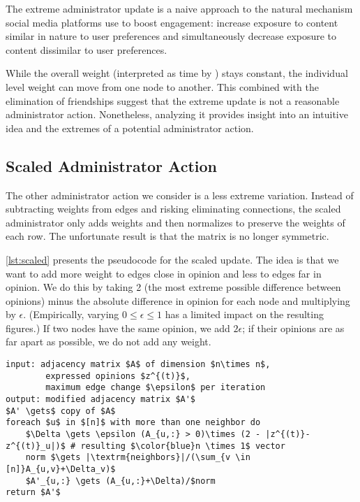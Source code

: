 The extreme administrator update is a naive approach
to the natural mechanism social media platforms use
to boost engagement: increase exposure to content
similar in nature to user preferences
and simultaneously decrease exposure to content
dissimilar to user preferences.

While the overall weight (interpreted as time
by \cite{chitra20analyzing}) stays constant,
the individual level weight can move from one
node to another.
This combined with the elimination of friendships
suggest that the extreme update is not a reasonable
administrator action.
Nonetheless, analyzing it provides insight into an
intuitive idea and the extremes of a potential
administrator action.

\pagebreak

\subsection{Scaled Administrator Action}
The other administrator action we consider
is a less extreme variation.
Instead of subtracting weights from edges
and risking eliminating connections,
the scaled administrator only adds weights
and then normalizes to preserve the 
weights of each row.
The unfortunate result is that the
matrix is no longer symmetric.

\cref{lst:scaled} presents the pseudocode for
the scaled update.
The idea is that we want to add more weight
to edges close in opinion and less to edges far
in opinion.
We do this by taking 2 (the most extreme possible
difference between opinions) minus the absolute
difference in opinion for each node
and multiplying by $\epsilon$.
(Empirically, varying $0 \leq \epsilon \leq 1$
has a limited impact on the resulting figures.)
If two nodes have the same opinion, we add
$2\epsilon$; if their opinions are as far
apart as possible, we do not add any weight.

\begin{minipage}{\linewidth}
\begin{lstlisting}[caption={Scaled Administrator Update.}, label={lst:scaled}]
input: adjacency matrix $A$ of dimension $n\times n$,
        expressed opinions $z^{(t)}$,
        maximum edge change $\epsilon$ per iteration
output: modified adjacency matrix $A'$
$A' \gets$ copy of $A$
foreach $u$ in $[n]$ with more than one neighbor do
    $\Delta \gets \epsilon (A_{u,:} > 0)\times (2 - |z^{(t)}-z^{(t)}_u|)$ # resulting $\color{blue}n \times 1$ vector
    norm $\gets |\textrm{neighbors}|/(\sum_{v \in [n]}A_{u,v}+\Delta_v)$
    $A'_{u,:} \gets (A_{u,:}+\Delta)/$norm
return $A'$
\end{lstlisting}
\end{minipage}

